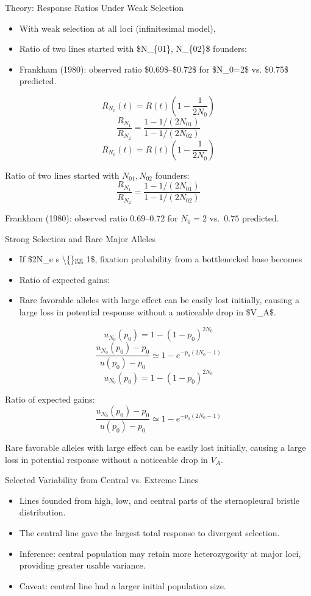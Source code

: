 \documentclass[10pt, aspectratio=169]{ctexbeamer}
\begin{document}
\begin{frame}{Theory: Response Ratios Under Weak Selection}
  \begin{itemize}
    \item With weak selection at all loci (infinitesimal model),
    \item Ratio of two lines started with \$N\_\{01\}, N\_\{02\}\$ founders:
    \item Frankham (1980): observed ratio \$0.69\$--\$0.72\$ for \$N\_0=2\$ vs. \$0.75\$ predicted.
  \end{itemize}
  \[
    R_{N_0}(t) = R(t)\left(1 - \frac{1}{2N_0}\right) \tag{26.24a}
  \]
  \[
    \frac{R_{N_1}}{R_{N_2}} = \frac{1 - 1/(2N_{01})}{1 - 1/(2N_{02})} \tag{26.24b}
  \]
  \[
    R_{N_0}(t) = R(t)\left(1 - \frac{1}{2N_0}\right) \tag{26.24a} \] \item<2-> Ratio of two lines started with $N_{01}, N_{02}$ founders: \[ \frac{R_{N_1}}{R_{N_2}} = \frac{1 - 1/(2N_{01})}{1 - 1/(2N_{02})} \tag{26.24b} \] \item<3-> Frankham (1980): observed ratio $0.69$--$0.72$ for $N_0=2$ vs.\ $0.75$ predicted.
  \]
\end{frame}

\begin{frame}{Strong Selection and Rare Major Alleles}
  \begin{itemize}
    \item If \$2N\_e s \textbackslash\{\}gg 1\$, fixation probability from a bottlenecked base becomes
    \item Ratio of expected gains:
    \item Rare favorable alleles with large effect can be easily lost initially, causing a large loss in potential response without a noticeable drop in \$V\_A\$.
  \end{itemize}
  \[
    u_{N_0}(p_0) = 1 - (1-p_0)^{2N_0} \tag{26.25a}
  \]
  \[
    \frac{u_{N_0}(p_0)-p_0}{u(p_0)-p_0} \simeq 1 - e^{-p_0(2N_0-1)} \tag{26.25b}
  \]
  \[
    u_{N_0}(p_0) = 1 - (1-p_0)^{2N_0} \tag{26.25a} \] \item<2-> Ratio of expected gains: \[ \frac{u_{N_0}(p_0)-p_0}{u(p_0)-p_0} \simeq 1 - e^{-p_0(2N_0-1)} \tag{26.25b} \] \item<3-> Rare favorable alleles with large effect can be easily lost initially, causing a large loss in potential response without a noticeable drop in $V_A$.
  \]
\end{frame}

\begin{frame}{Selected Variability from Central vs. Extreme Lines}
  \begin{itemize}
    \item Lines founded from high, low, and central parts of the sternopleural bristle distribution.
    \item The central line gave the largest total response to divergent selection.
    \item Inference: central population may retain more heterozygosity at major loci, providing greater usable variance.
    \item Caveat: central line had a larger initial population size.
  \end{itemize}
\end{frame}
\end{document}
